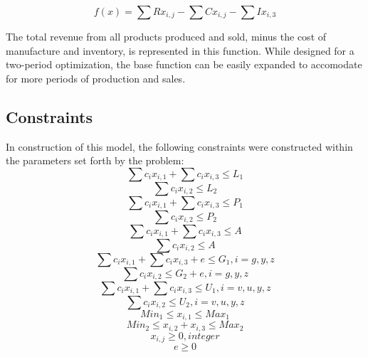 \documentclass{article}
\begin{document}
$$f(x) = \sum{Rx_{i,j}} - \sum{Cx_{i,j}} - \sum Ix_{i,3} $$

The total revenue from all products produced and sold, minus the cost of manufacture and inventory, is represented in this function.  While designed for a two-period optimization, the base function can be easily expanded to accomodate for more periods of production and sales.
\subsection{Constraints}
In construction of this model, the following constraints were constructed within the parameters set forth by the problem:
\begin{equation}
\sum c_{i}x_{i,1} + \sum c_{i}x_{i,3} \leq L_{1} %
\end{equation}
\begin{equation}
\sum c_{i}x_{i,2} \leq L_{2} %
\end{equation}
\begin{equation}
\sum c_{i}x_{i,1} + \sum c_{i}x_{i,3} \leq P_{1} %
\end{equation}
\begin{equation}
\sum c_{i}x_{i,2} \leq P_{2}%
\end{equation}
\begin{equation}
\sum c_{i}x_{i,1} + \sum c_{i}x_{i,3} \leq A %
\end{equation}
\begin{equation}
\sum c_{i}x_{i,2} \leq A %
\end{equation}
\begin{equation}
\sum c_{i}x_{i,1} + \sum c_{i}x_{i,3} + e \leq G_{1},  i = g, y, z %
\end{equation}
\begin{equation}
\sum c_{i}x_{i,2} \leq G_{2} + e, i = g, y, z %
\end{equation}
\begin{equation}
\sum c_{i}x_{i,1} + \sum c_{i}x_{i,3} \leq U_{1} , i = v, u, y, z %
\end{equation}
\begin{equation}
\sum c_{i}x_{i,2} \leq U_{2},  i = v, u, y, z %
\end{equation}
\begin{equation}
Min_{1} \leq x_{i,1} \leq Max_{1} %
\end{equation}
\begin{equation}
Min_{2} \leq x_{i,2} + x_{i,3} \leq Max_{2}
\end{equation}
\begin{equation}
x_{i,j} \geq 0, integer %
\end{equation}
\begin{equation}
e \geq 0
\end{equation}
\end{document}
